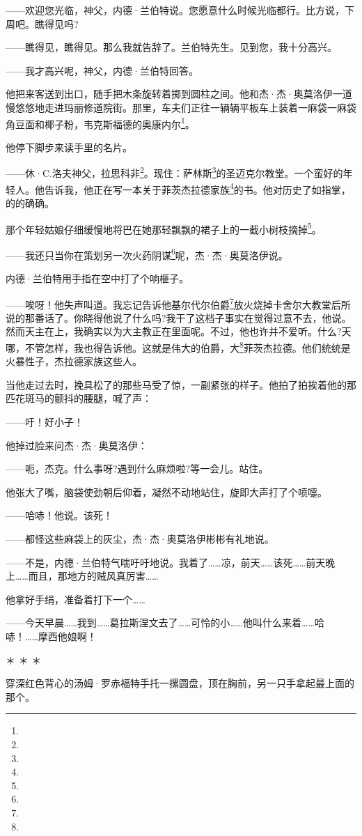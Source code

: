 \par ——欢迎您光临，神父，内德·兰伯特说。您愿意什么时候光临都行。比方说，下周吧。瞧得见吗?
\par ——瞧得见，瞧得见。那么我就告辞了。兰伯特先生。见到您，我十分高兴。
\par ——我才高兴呢，神父，内德·兰伯特回答。
\par 他把来客送到出口，随手把木条旋转着掷到圆柱之间。他和杰·杰·奥莫洛伊一道慢悠悠地走进玛丽修道院街。那里，车夫们正往一辆辆平板车上装着一麻袋一麻袋角豆面和椰子粉，韦克斯福德的奥康内尔\footnote{}。
\par 他停下脚步来读手里的名片。
\par ——休·C.洛夫神父，拉思科非\footnote{}。现住：萨林斯\footnote{}的圣迈克尔教堂。一个蛮好的年轻人。他告诉我，他正在写一本关于菲茨杰拉德家族\footnote{}的书。他对历史了如指掌，的的确确。
\par 那个年轻姑娘仔细缓慢地将巴在她那轻飘飘的裙子上的一截小树枝摘掉\footnote{}。
\par ——我还只当你在策划另一次火药阴谋\footnote{}呢，杰·杰·奥莫洛伊说。
\par 内德·兰伯特用手指在空中打了个响榧子。
\par ——唉呀！他失声叫道。我忘记告诉他基尔代尔伯爵\footnote{}放火烧掉卡舍尔大教堂后所说的那番话了。你晓得他说了什么吗?我干了这档子事实在觉得过意不去，他说。然而天主在上，我确实以为大主教正在里面呢。不过，他也许并不爱听。什么?天哪，不管怎样，我也得告诉他。这就是伟大的伯爵，大\footnote{}菲茨杰拉德。他们统统是火暴性子，杰拉德家族这些人。
\par 当他走过去时，挽具松了的那些马受了惊，一副紧张的样子。他拍了拍挨着他的那匹花斑马的颤抖的腰腿，喊了声：
\par ——吁！好小子！
\par 他掉过脸来问杰·杰·奥莫洛伊：
\par ——呃，杰克。什么事呀?遇到什么麻烦啦?等一会儿。站住。
\par 他张大了嘴，脑袋使劲朝后仰着，凝然不动地站住，旋即大声打了个喷嚏。
\par ——哈哧！他说。该死！
\par ——都怪这些麻袋上的灰尘，杰·杰·奥莫洛伊彬彬有礼地说。
\par ——不是，内德·兰伯特气喘吁吁地说。我着了……凉，前天……该死……前天晚上……而且，那地方的贼风真厉害……
\par 他拿好手绢，准备着打下一个……
\par ——今天早晨……我到……葛拉斯涅文去了……可怜的小……他叫什么来着……哈哧！……摩西他娘啊！
\par ＊ ＊ ＊
\par 穿深红色背心的汤姆·罗赤福特手托一摞圆盘，顶在胸前，另一只手拿起最上面的那个。
